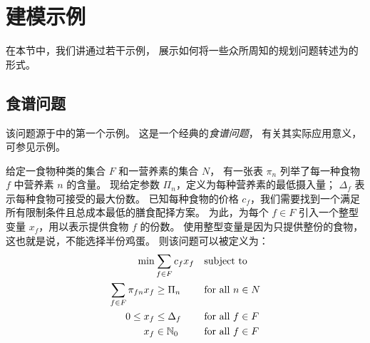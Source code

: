 \clearpage
\section{建模示例}\label{modelingexamples}
在本节中，我们讲通过若干示例，
展示如何将一些众所周知的规划问题转述为\zimpl 的形式。

\subsection{食谱问题}
该问题源于\cite[Chapter 1, page 3]{Chvatal1983}中的第一个示例。
这是一个经典的\emph{食谱问题}，
有关其实际应用意义，可参见示例\cite{Dantzig1990}。

给定一食物种类的集合 $F$ 和一营养素的集合 $N$，
有一张表 $\pi_{n}$ 列举了每一种食物 $f$ 中营养素 $n$ 的含量。
现给定参数 $\Pi_n$，定义为每种营养素的最低摄入量；
$\Delta_f$ 表示每种食物可接受的最大份数。
已知每种食物的价格 $c_f$，我们需要找到一个满足所有限制条件且总成本最低的膳食配择方案。
为此，为每个 $f \in F$ 引入一个整型变量 $x_f$，用以表示提供食物 $f$ 的份数。
使用整型变量是因为只提供整份的食物，这也就是说，不能选择半份鸡蛋。
则该问题可以被定义为：
\begin{align*}
\min&\sum_{f\in F}c_{f} x_{f}&&\mbox{subject to}\nonumber\\
\sum_{f\in F} \pi_{fn} x_{f}&\ge\Pi_n&&\text{for all } n\in N\nonumber\\
0\leq x_{f}&\leq\Delta_f&&\text{for all } f\in F\nonumber\\
x_{f}&\in\mathbb{N}_0&&\text{for all } f\in F
\end{align*}

